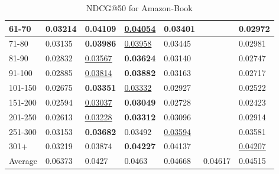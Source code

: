 \begin{table*}[]
\begin{tabular}{|l|l|l|l|l|l|l|}
        61-70   & 0.03214                        & \textbf{0.04109}               & \underline{0.04054}            & 0.03401                        &                                & 0.02972                               \\ \hline
        71-80   & 0.03135                        & \textbf{0.03986}               & \underline{0.03958}            & 0.03445                        &                                & 0.02981                               \\ \hline
        81-90   & 0.02832                        & \underline{0.03567}            & \textbf{0.03624}               & 0.03140                        &                                & 0.02747                               \\ \hline
        91-100  & 0.02885                        & \underline{0.03814}            & \textbf{0.03882}               & 0.03163                        &                                & 0.02717                               \\ \hline
        101-150 & 0.02675                        & \textbf{0.03351}               & \underline{0.03332}            & 0.02927                        &                                & 0.02522                               \\ \hline
        151-200 & 0.02594                        & \underline{0.03037}            & \textbf{0.03049}               & 0.02728                        &                                & 0.02423                               \\ \hline
        201-250 & 0.02613                        & \underline{0.03228}            & \textbf{0.03312}               & 0.03096                        &                                & 0.02914                               \\ \hline
        251-300 & 0.03153                        & \textbf{0.03682}               & 0.03492                        & \underline{0.03594}            &                                & 0.03581                               \\ \hline
        301+    & 0.03219                        & 0.03874                        & \textbf{0.04227}               & 0.04137                        &                                & \underline{0.04207}                   \\ \hline
        Average & 0.06373                        & 0.0427                         & 0.0463                         & 0.04668                        & 0.04617                        & 0.04515                               \\ \hline
    \end{tabular}
    \caption{NDCG@50 for Amazon-Book}
\end{table*}

